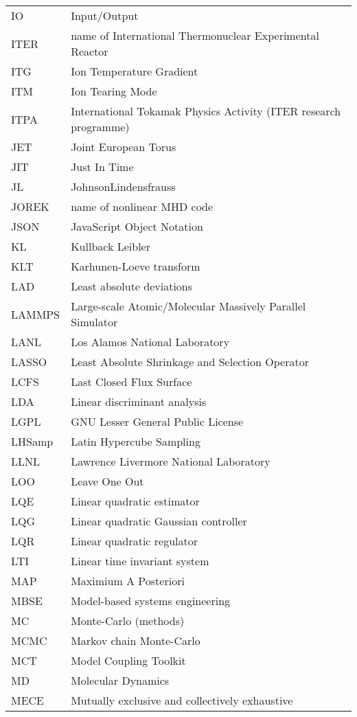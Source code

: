 \begin{longtable}{|p{4.0cm}|p{12.0cm}|}
IO & Input/Output \\
ITER & name of International Thermonuclear Experimental Reactor \\
ITG & Ion Temperature Gradient \\
ITM & Ion Tearing Mode \\
ITPA & International Tokamak Physics Activity (ITER research programme)\\
JET & Joint European Torus \\
JIT & Just In Time \\
JL  & JohnsonLindensfrauss \\
JOREK & name of nonlinear MHD code\\
JSON & JavaScript Object Notation \\
KL  & Kullback Leibler \\
KLT  & Karhunen-Loeve transform \\
LAD  & Least absolute deviations \\
LAMMPS & Large-scale Atomic/Molecular Massively Parallel Simulator\\
LANL & Los Alamos National Laboratory \\
LASSO & Least Absolute Shrinkage and Selection Operator \\
LCFS & Last Closed Flux Surface \\
LDA  & Linear discriminant analysis \\
LGPL & GNU Lesser General Public License \\
LHSamp & Latin Hypercube Sampling\\
LLNL & Lawrence Livermore National Laboratory \\
LOO & Leave One Out  \\
LQE  & Linear quadratic estimator \\
LQG  & Linear quadratic Gaussian controller \\
LQR  & Linear quadratic regulator \\
LTI  & Linear time invariant system \\
MAP & Maximium A Posteriori \\
MBSE & Model-based systems engineering \\
MC & Monte-Carlo (methods) \\
MCMC & Markov chain Monte-Carlo \\
MCT &  Model Coupling Toolkit \\ %
MD & Molecular Dynamics \\
MECE & Mutually exclusive and collectively exhaustive \\

\end{longtable}
